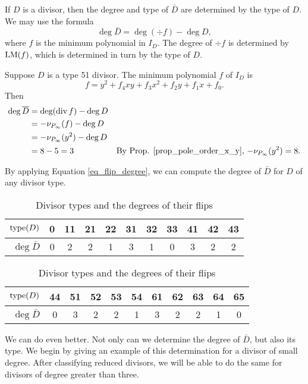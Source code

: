 If $D$ is a divisor, then the degree and type of $\bar D$ are determined by the type of $D$.
We may use the formula
\begin{equation}
  \label{eq_flip_degree}
  \deg \bar D = \deg (\div f) - \deg D,
\end{equation}
where $f$ is the minimum polynomial in $I_D$. The degree of $\div f$ is determined by $\LM(f)$,
which is determined in turn by the type of $D$.
\begin{example}
  Suppose $D$ is a type 51 divisor.
  The minimum polynomial $f$ of $I_D$ is
  \[ f = y^2 + f_4xy + f_3x^2 + f_2y + f_1x + f_0. \]
  Then
  \begin{align*}
    \deg \bar D &= \deg (\div f) - \deg D \\
                &= -\nu_{P_\infty}(f) - \deg D \\
                &= -\nu_{P_\infty}(y^2) - \deg D \\
                &= 8 - 5 = 3
                  & \text{By Prop. \ref{prop_pole_order_x_y}, $-\nu_{P_\infty}(y^2) = 8$.}
  \end{align*}
\end{example}

By applying Equation \ref{eq_flip_degree},
we can compute the degree of $\bar D$ for $D$ of any divisor type.
\begin{table}[hb!]
\caption{Divisor types and the degrees of their flips}
\label{tab_flip_degree}
\begin{center}
  \begin{tabular}{r|cccccccccc}
    $\type(D)$    & 0 & 11 & 21 & 22 & 31 & 32 & 33 & 41 & 42 & 43 \\
    \hline
    $\deg \bar D$ & 0 & 2  & 2  & 1  & 3  & 1  & 0  & 3  & 2  & 2
  \end{tabular}
    
  \begin{tabular}{r|cccccccccc}
    $\type(D)$    & 44 & 51 & 52 & 53 & 54 & 61 & 62 & 63 & 64 & 65 \\
    \hline 
    $\deg \bar D$ & 0  & 3  & 2  & 2  & 1  & 3  & 2  & 2  & 1  & 0
  \end{tabular}
\end{center}
\end{table}

We can do even better.
Not only can we determine the degree of $\bar D$, but also its type.
We begin by giving an example of this determination for a divisor of small degree.
After classifying reduced divisors, we will be able to do the same for divisors of degree greater than three.


